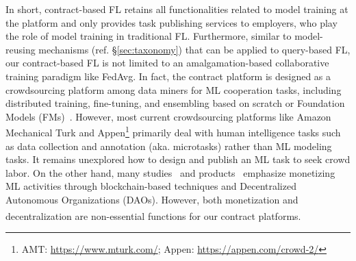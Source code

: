 In short, contract-based FL retains all functionalities related to model training at the platform and only provides task publishing services to employers, who play the role of model training in traditional FL.
Furthermore, similar to model-reusing mechanisms (ref. \S\ref{sec:taxonomy}) that can be applied to query-based FL, our contract-based FL is not limited to an amalgamation-based collaborative training paradigm like FedAvg.
In fact, the contract platform is designed as a crowdsourcing platform among data miners for ML cooperation tasks, including distributed training, fine-tuning, and ensembling based on scratch or Foundation Models (FMs)~\cite{yuan2022decentralized}.
However, most current crowdsourcing platforms like Amazon Mechanical Turk and Appen\footnote{AMT: \url{https://www.mturk.com/}; Appen: \url{https://appen.com/crowd-2/}} primarily deal with human intelligence tasks such as data collection and annotation (aka. microtasks) rather than ML modeling tasks. 
It remains unexplored how to design and publish an ML task to seek crowd labor.
On the other hand, many studies~\cite{dias2022blocklearning, blythman2022decentralized, deng2021flex, guo2023blockchain, batool2022fl} and products~\cite{steeves2022incentivizing, ziller2021pysyft, mcconaghy2022ocean} emphasize monetizing ML activities through blockchain-based techniques and Decentralized Autonomous Organizations (DAOs). 
However, both monetization and decentralization are non-essential functions for our contract platforms\textsuperscript{}.

